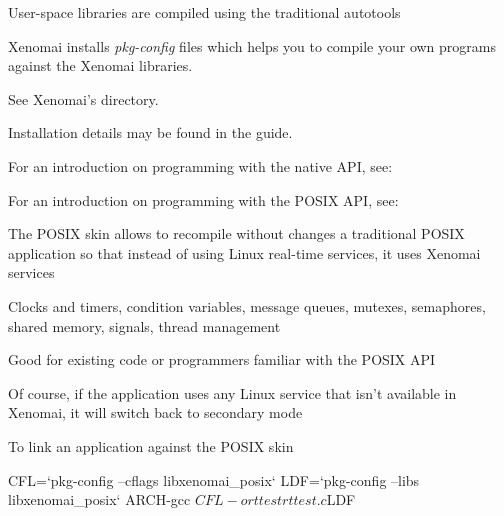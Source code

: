   \startitemize
  \item User-space libraries are compiled using the traditional autotools
    \startitemize
    \item {}
    \stopitemize
  \item Xenomai installs {\em pkg-config} files which helps you to
    compile your own programs against the Xenomai libraries.
  \item See Xenomai's  directory.
  \item Installation details may be found in the 
    guide.
  \item For an introduction on programming with the native API, see:\\
  \item For an introduction on programming with the POSIX API, see:\\
  \stopitemize


  \startitemize
  \item The POSIX skin allows to recompile without changes a
    traditional POSIX application so that instead of using Linux
    real-time services, it uses Xenomai services
    \startitemize
    \item Clocks and timers, condition variables, message queues,
      mutexes, semaphores, shared memory, signals, thread management
    \item Good for existing code or programmers familiar with the
      POSIX API
    \stopitemize
  \item Of course, if the application uses any Linux service that
    isn't available in Xenomai, it will switch back to secondary mode
  \item To link an application against the POSIX skin
  \stopitemize
  \begin{block}{}
\small
\starttyping
CFL=`pkg-config --cflags libxenomai_posix`
LDF=`pkg-config --libs libxenomai_posix`
ARCH-gcc $CFL -o rttest rttest.c $LDF
\stoptyping
\end{block}

